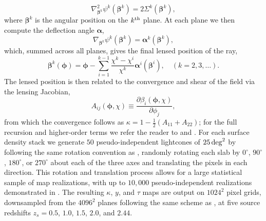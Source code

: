 \documentclass[linenumbers,trackchanges, twocolumn]{aastex701}
\begin{document}
\begin{equation}
    \nabla^2_{\bm{\beta}^k} \psi^k(\bm{\beta}^k) = 2\Sigma^k(\bm{\beta}^k),
\end{equation}
where $\bm{\beta}^k$ is the angular position on the $k^{\rm th}$ plane. At each plane we then compute the deflection angle $\bm{\alpha}$,
\begin{equation}
    \nabla_{\bm{\beta}^k} \psi^k(\bm{\beta}^k) = \bm{\alpha}^k(\bm{\beta}^k),
\end{equation}
which, summed across all planes, gives the final lensed position of the ray,
\begin{equation}\label{eq:beta}
    \bm{\beta}^k(\bm{\phi}) = \bm{\phi} - \sum_{i=1}^{k-1}\dfrac{\chi^k-\chi^i}{\chi^k}\bm{\alpha}^i(\bm{\beta}^i), \quad (k=2, 3,\dots).
\end{equation}
The lensed position is then related to the convergence and shear of the field via the lensing Jacobian,
\begin{equation}
    A_{ij}(\bm{\phi}, \chi) \equiv \dfrac{\partial\beta_i(\bm{\phi}, \chi)}{\partial\phi_j},
\end{equation}
from which the convergence follows as $\kappa = 1 - \tfrac{1}{2}\left(A_{11}+A_{22}\right)$; for the full recursion and higher-order terms we refer the reader to \citet{Osato-2021} and \citet{Hilbert-2009}.
For each surface density stack we generate $50$ pseudo-independent lightcones of $25\,{\rm deg}^2$ by following the same rotation convention as \citet{Osato-2021}, randomly rotating each slab by $0^\circ$, $90^\circ$, $180^\circ$, or $270^\circ$ about each of the three axes and translating the pixels in each direction. This rotation and translation process allows for a large statistical sample of map realizations, with up to $10{,}000$ pseudo-independent realizations demonstrated in \citet{Petri-2016}.
The resulting $\kappa$, $y$, and $\tau$ maps are output on $1024^2$ pixel grids, downsampled from the $4096^2$ planes following the same scheme as \citet{Osato-2021}, at five source redshifts $z_s = 0.5$, $1.0$, $1.5$, $2.0$, and $2.44$.
 
\end{document}
